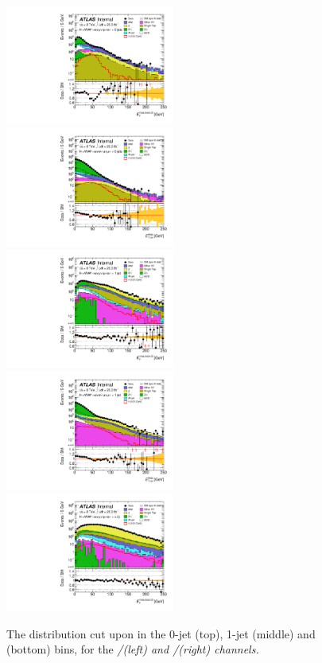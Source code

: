 \begin{figure}
	\includegraphics[width=0.495\textwidth]{tex/selection/emme_CutZVeto_0jet_MET_TrackHWW_Clj_mh125_log}
	\hfill
	\includegraphics[width=0.495\textwidth]{tex/selection/eemm_CutZVeto_0jet_METRel_mh125_log}
	\\
	\includegraphics[width=0.495\textwidth]{tex/selection/emme_CutZVeto_1jet_MET_TrackHWW_Clj_mh125_log}
	\hfill
	\includegraphics[width=0.495\textwidth]{tex/selection/eemm_CutZVeto_1jet_METRel_mh125_log}
	\\
	\includegraphics[width=0.495\textwidth]{tex/selection/emme_CutZVeto_2jetincl_MET_TrackHWW_Clj_mh125_log}
	\hfill\null
	\caption{The \met distribution cut upon in the 0-jet (top), 1-jet (middle) and 
	\twojet (bottom) bins, for the \em/\me (left) and \ee/\mm (right) channels.}
	\label{fig:sel:met}
\end{figure}

